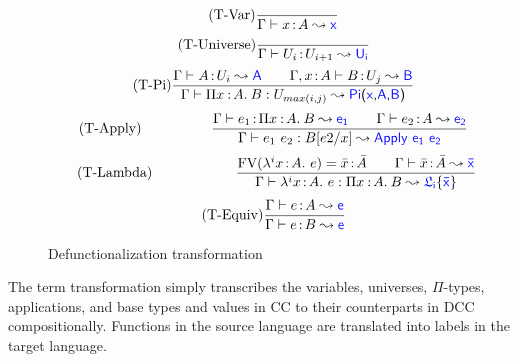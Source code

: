 \begin{figure}
	\begin{equation}
		\tag{T-Var}
		\frac
			{}
			{\Gamma \vdash x \goodcolon A \leadsto \target{x}}
	\end{equation} \hspace{0.5cm}
	\begin{equation}
		\tag{T-Universe}
		\frac
			{}
			{\Gamma \vdash U_i \goodcolon U_{i+1} \leadsto \target{U_i}}
	\end{equation} \hspace{0.5cm}
	\begin{equation}
		\tag{T-Pi}
		\frac
			{\Gamma \vdash A \goodcolon U_i \leadsto \target{A} \qquad \Gamma, x \goodcolon A \vdash B \goodcolon U_j \leadsto \target{B}
			}
			{\Gamma \vdash \pitype{x}{A}{B} \mathrel{:} U_{max(i, j)} \leadsto \targetpi{x}{A}{B}}
	\end{equation} \hspace{0.5cm}
	\begin{equation}
		\tag{T-Apply}
		\qquad\qquad\quad
		\frac
			{\Gamma \vdash e_1 \goodcolon \pitype{x}{A}{B} \leadsto \target{e_1} \qquad \Gamma \vdash e_2 \goodcolon A \leadsto \target{e_2}}
			{\Gamma \vdash e_1 \ e_2 \mathrel{:} B\sub{e2}{x} \leadsto \targetapp{e_1}{e_2}}
	\end{equation} \hspace{0.5cm}
	\begin{equation}
		\tag{T-Lambda}
		\qquad\qquad\qquad
		\frac
			{ \text{FV}(\lami{i}{x}{A}{e}) = \bar{x} \goodcolon \bar{A} \qquad \Gamma \vdash \bar{x} \goodcolon \bar{A} \leadsto \target{\bar{x}} }
			{ \Gamma \vdash \lami{i}{x}{A}{e} \mathrel{:} \pitype{x}{A}{B} \leadsto \target{\flabel_i}\{\target{\bar{x}}\}}
	\end{equation} \hspace{0.5cm}
	\begin{equation}
		\tag{T-Equiv}
		\frac
			{\Gamma \vdash e \goodcolon A \leadsto \target{e}}
			{\Gamma \vdash e \goodcolon B \leadsto \target{e}}
	\end{equation}
	\caption{Defunctionalization transformation}
    \label{fig:dcc transformation}
\end{figure}

The term transformation simply transcribes the variables, universes, $\Pi$-types, applications, and base types and values in CC to their counterparts in DCC compositionally. Functions in the source language are translated into labels in the target language.

